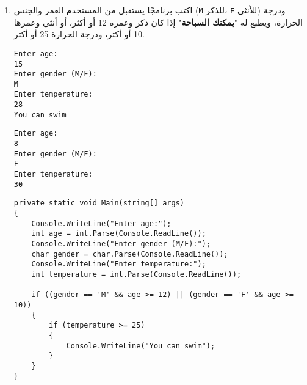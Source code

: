 \documentclass[12pt]{article}
\begin{document}
\begin{enumerate}[itemsep=3em]
\begin{enumerate}[itemsep=3em]
\begin{enumerate}[itemsep=3em]
\begin{enumerate}[itemsep=3em]
\begin{enumerate}[itemsep=3em]
\begin{enumerate}
\item
اكتب برنامجًا يستقبل من المستخدم العمر والجنس (\texttt{M} للذكر، \texttt{F} للأنثى) ودرجة الحرارة، ويطبع له "\textbf{يمكنك السباحة}" إذا كان ذكر وعمره 12 أو أكثر، أو أنثى وعمرها 10 أو أكثر، ودرجة الحرارة 25 أو أكثر.
\ifdetailed
\begin{example}[1]
\begin{english}
\begin{lstlisting}
Enter age:
15
Enter gender (M/F):
M
Enter temperature:
28
You can swim
\end{lstlisting}
\end{english}
\end{example}
\begin{example}[2]
\begin{english}
\begin{lstlisting}
Enter age:
8
Enter gender (M/F):
F
Enter temperature:
30
\end{lstlisting}
\end{english}
\end{example}

\ifwithsols
\begin{solution}
\begin{english}
\begin{lstlisting}
private static void Main(string[] args)
{
    Console.WriteLine("Enter age:");
    int age = int.Parse(Console.ReadLine());
    Console.WriteLine("Enter gender (M/F):");
    char gender = char.Parse(Console.ReadLine());
    Console.WriteLine("Enter temperature:");
    int temperature = int.Parse(Console.ReadLine());

    if ((gender == 'M' && age >= 12) || (gender == 'F' && age >= 10))
    {
        if (temperature >= 25)
        {
            Console.WriteLine("You can swim");
        }
    }
}
\end{lstlisting}
\end{english}
\end{solution}
\clearpage
\fi
\fi


\end{enumerate}
\end{enumerate}
\end{enumerate}
\end{enumerate}
\end{enumerate}
\end{enumerate}
\end{document}

